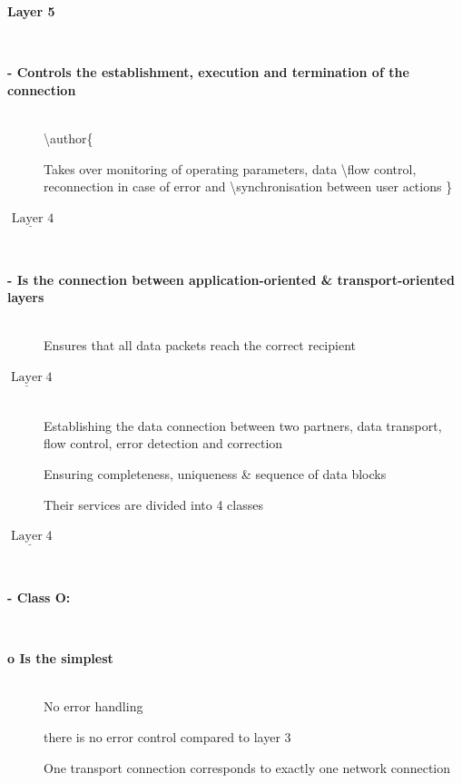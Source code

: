 \begin{description}
\os{\newpage}\item[{\rot\bf Layer 5 }]~\\[-3ex]

\os{\newpage}\item[{\rot\bf  - Controls the establishment, execution and termination of the connection }]~\\[-3ex]

\textbackslash author\{

\bi
  \ite Takes over monitoring of operating parameters, data \textbackslash  flow control, reconnection in case of error and \textbackslash  synchronisation between user actions
\}
\ei


\os{\newpage}\item[{\rot\bf  $\underline{\text { Layer } 4}$ }]~\\[-3ex]


\os{\newpage}\item[{\rot\bf  - Is the connection between application-oriented \& transport-oriented layers }]~\\[-3ex]

\bi
  \ite Ensures that all data packets reach the correct
recipient
\ei


\os{\newpage}\item[{\rot\bf  $\underline{\operatorname{Layer}} 4$ }]~\\[-3ex]

\bi
  \ite Establishing the data connection between two partners, data transport, flow control, error detection and correction

  \ite Ensuring completeness, uniqueness \& sequence of data blocks

  \ite Their services are divided into 4 classes

\ei


\os{\newpage}\item[{\rot\bf  $\underline{\operatorname{Layer} 4}$ }]~\\[-3ex]


\os{\newpage}\item[{\rot\bf  - Class O: }]~\\[-3ex]


\os{\newpage}\item[{\rot\bf  o Is the simplest }]~\\[-3ex]
\bi
 \ite No error handling
 \ei

\bi
 \ite there is no error control compared to layer 3
 \ei

\bi
 \ite One transport connection corresponds to exactly one network connection
 \ei




\end{description}
